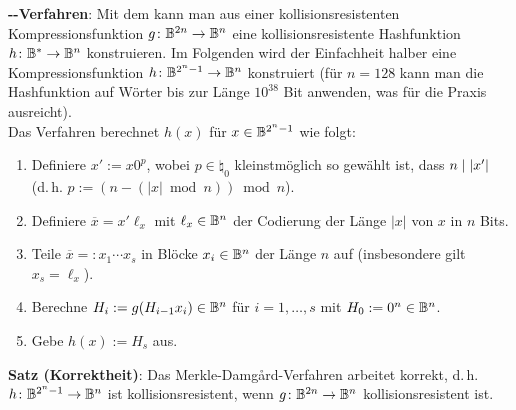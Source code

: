 \textbf{--Verfahren}:
Mit dem  kann man
aus einer kollisionsresistenten Kompressionsfunktion $g\colon \mathbb{B}^{2n} \to \mathbb{B}^n$
eine kollisionsresistente Hashfunktion $h\colon \mathbb{B}^\ast \to \mathbb{B}^n$ konstruieren.
Im Folgenden wird der Einfachheit halber eine Kompressionsfunktion $h\colon \mathbb{B}^{2^n-1} \to \mathbb{B}^n$
konstruiert (für $n = 128$ kann man die Hashfunktion auf Wörter bis zur Länge $10^{38}$ Bit
anwenden, was für die Praxis ausreicht).\\
Das Verfahren berechnet $h(x)$ für $x \in \mathbb{B}^{2^n-1}$ wie folgt:
\begin{enumerate}
    \item
    Definiere $x' := x 0^p$, wobei $p \in \natural_0$ kleinstmöglich so gewählt ist, dass
    $n \mid |x'|$\\
    (d.\,h. $p := (n - (|x| \bmod n)) \bmod n$).

    \item
    Definiere $\overline{x} = x' \ell_x$ mit $\ell_x \in \mathbb{B}^n$
    der Codierung der Länge $|x|$ von $x$ in $n$ Bits.

    \item
    Teile $\overline{x} =: x_1 \dotsb x_s$ in Blöcke $x_i \in \mathbb{B}^n$ der Länge $n$ auf
    (insbesondere gilt $x_s = \ell_x$).

    \item
    Berechne $H_i := g(H_{i-1} x_i) \in \mathbb{B}^n$ für $i = 1, \dotsc, s$ mit $H_0 := 0^n \in \mathbb{B}^n$.

    \item
    Gebe $h(x) := H_s$ aus.
\end{enumerate}

\linie

\textbf{Satz (Korrektheit)}:
Das Merkle-Damgård-Verfahren arbeitet korrekt, d.\,h. $h\colon \mathbb{B}^{2^n-1} \to \mathbb{B}^n$ ist
kollisionsresistent, wenn $g\colon \mathbb{B}^{2n} \to \mathbb{B}^n$ kollisionsresistent ist.

